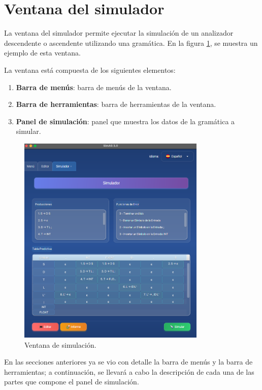 \section{Ventana del simulador}

La ventana del simulador permite ejecutar la simulación de un analizador descendente o ascendente utilizando una gramática. En la figura \ref{fig:d5}, se muestra un ejemplo de esta ventana.

La ventana está compuesta de los siguientes elementos:
\begin{enumerate}
 \item \textbf{Barra de menús}: barra de menús de la ventana.
 \item \textbf{Barra de herramientas}: barra de herramientas de la ventana.
 \item \textbf{Panel de simulación}: panel que muestra los datos de la gramática a simular.
\end{enumerate}

\begin{figure}[htp]
\centering
	\includegraphics[width=0.8\textwidth]{figuras2/ejemplo_practico/simulador.png}
	\caption{Ventana de simulación.}
	\label{fig:d5}
\end{figure}

  En las secciones anteriores ya se vio con detalle la barra de menús y la barra de herramientas; a continuación, se llevará a cabo la descripción de cada una de las partes que compone el panel de simulación.



